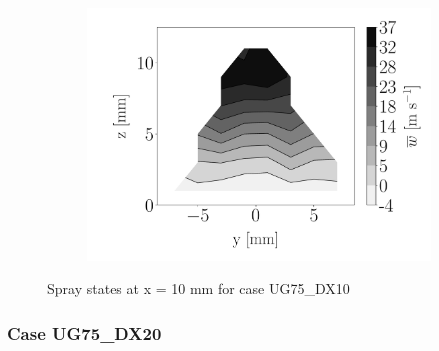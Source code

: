 \begin{figure}[h!]
\begin{subfigure}[b]{0.3\textwidth}
	\centering
   \includegraphics[scale=\scaleSLIJICF]{./part2_developments/figures_ch5_resolved_JICF/injectors_SLI/uG75_dx10_x10_uz_mean_map}
\end{subfigure}
\caption{Spray states at x = 10 mm for case UG75\_DX10}
\label{fig:injectors_sli_uG75_dx10_x10}
\end{figure}


\clearpage

\subsubsection*{Case UG75\_DX20}




